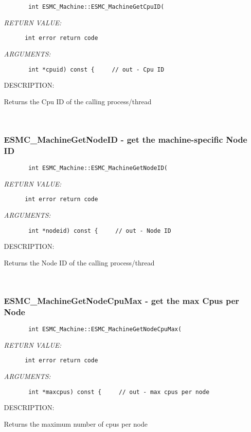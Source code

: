   
\begin{verbatim}       int ESMC_Machine::ESMC_MachineGetCpuID(\end{verbatim}{\em RETURN VALUE:}
\begin{verbatim}      int error return code\end{verbatim}{\em ARGUMENTS:}
\begin{verbatim}       int *cpuid) const {     // out - Cpu ID\end{verbatim}
{\sf DESCRIPTION:\\ }


       Returns the Cpu ID of the calling process/thread
   
 
\mbox{}\hrulefill\ 
 
\subsubsection{ESMC\_MachineGetNodeID - get the machine-specific Node ID}


  
\begin{verbatim}       int ESMC_Machine::ESMC_MachineGetNodeID(\end{verbatim}{\em RETURN VALUE:}
\begin{verbatim}      int error return code\end{verbatim}{\em ARGUMENTS:}
\begin{verbatim}       int *nodeid) const {     // out - Node ID\end{verbatim}
{\sf DESCRIPTION:\\ }


       Returns the Node ID of the calling process/thread
   
 
\mbox{}\hrulefill\ 
 
\subsubsection{ESMC\_MachineGetNodeCpuMax - get the max Cpus per Node}


  
\begin{verbatim}       int ESMC_Machine::ESMC_MachineGetNodeCpuMax(\end{verbatim}{\em RETURN VALUE:}
\begin{verbatim}      int error return code\end{verbatim}{\em ARGUMENTS:}
\begin{verbatim}       int *maxcpus) const {     // out - max cpus per node\end{verbatim}
{\sf DESCRIPTION:\\ }


       Returns the maximum number of cpus per node
  
